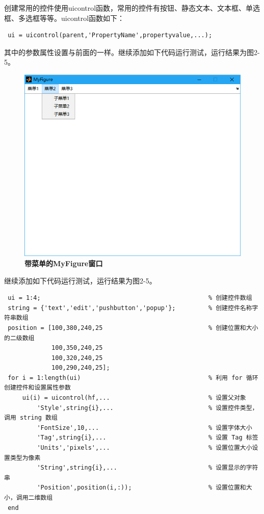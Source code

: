 \begin{enumerate}
	\qquad 创建常用的控件使用uicontrol函数，常用的控件有按钮、静态文本、文本框、单选框、多选框等等。uicontrol函数如下：
	\begin{lstlisting}
 ui = uicontrol(parent,'PropertyName',propertyvalue,...);\end{lstlisting}
 	其中的参数属性设置与前面的一样。继续添加如下代码运行测试，运行结果为图2-5。
	\begin{figure}[H]
		\centering
		\includegraphics[scale=0.35]{MyFigure_uimenu}
		\caption{\textbf{带菜单的MyFigure窗口}}
	\end{figure}
	继续添加如下代码运行测试，运行结果为图2-5。
	\begin{lstlisting}
 ui = 1:4;												% 创建控件数组
 string = {'text','edit','pushbutton','popup'};			% 创建控件名称字符串数组
 position = [100,380,240,25								% 创建位置和大小的二级数组
             100,350,240,25
 			 100,320,240,25
             100,290,240,25];
 for i = 1:length(ui)									% 利用 for 循环创建控件和设置属性参数
     ui(i) = uicontrol(hf,...							% 设置父对象
         'Style',string{i},...							% 设置控件类型，调用 string 数组
         'FontSize',10,...								% 设置字体大小
		 'Tag',string{i},...							% 设置 Tag 标签
         'Units','pixels',...							% 设置位置大小设置类型为像素
         'String',string{i},...							% 设置显示的字符串
         'Position',position(i,:));						% 设置位置和大小，调用二维数组
 end\end{lstlisting}
 	\begin{figure}[H]
		\centering

\end{figure}
\end{enumerate}
